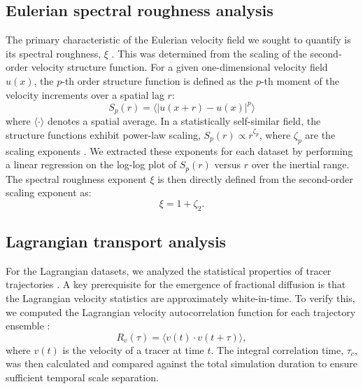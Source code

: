 \documentclass[]{article}
\begin{document}
\subsection{Eulerian spectral roughness analysis}
The primary characteristic of the Eulerian velocity field we sought to quantify is its spectral roughness, $\xi$ \citep{jafari2026statisticalfluxfreezingmagnetic}. This was determined from the scaling of the second-order velocity structure function. For a given one-dimensional velocity field $u(x)$, the $p$-th order structure function is defined as the $p$-th moment of the velocity increments over a spatial lag $r$:
\begin{equation}S_p(r) = \langle |u(x+r) - u(x)|^p \rangle\end{equation}
where $\langle \cdot \rangle$ denotes a spatial average. In a statistically self-similar field, the structure functions exhibit power-law scaling, $S_p(r) \propto r^{\zeta_p}$, where $\zeta_p$ are the scaling exponents \citep{eyink2000selfsimilardecaykraichnanmodel}. We extracted these exponents for each dataset by performing a linear regression on the log-log plot of $S_p(r)$ versus $r$ over the inertial range. The spectral roughness exponent $\xi$ is then directly defined from the second-order scaling exponent as:
\begin{equation}\xi = 1 + \zeta_2.\end{equation}

\subsection{Lagrangian transport analysis}
For the Lagrangian datasets, we analyzed the statistical properties of tracer trajectories \citep{biferale2024turblagrdatabase3dlagrangian}. A key prerequisite for the emergence of fractional diffusion is that the Lagrangian velocity statistics are approximately white-in-time. To verify this, we computed the Lagrangian velocity autocorrelation function for each trajectory ensemble \citep{dewit2026datadrivenmorizwanzigmodelinglagrangian}:
\begin{equation}R_v(\tau) = \langle v(t) \cdot v(t+\tau) \rangle,\end{equation}
where $v(t)$ is the velocity of a tracer at time $t$. The integral correlation time, $\tau_c$, was then calculated and compared against the total simulation duration to ensure sufficient temporal scale separation.
\end{document}
